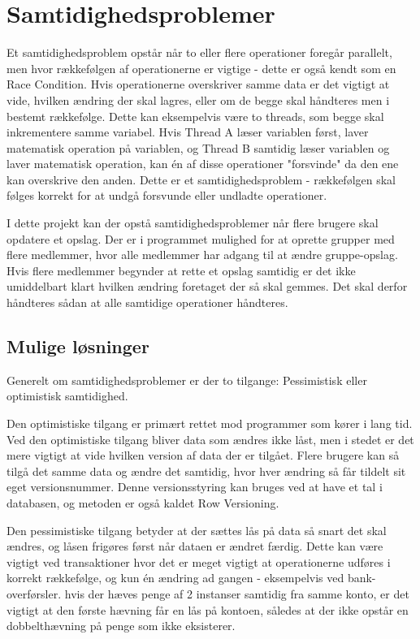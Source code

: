 \chapter{Samtidighedsproblemer}\label{ch:concurrency}
Et samtidighedsproblem opstår når to eller flere operationer foregår parallelt, men hvor rækkefølgen af operationerne er vigtige - dette er også kendt som en Race Condition.\cite{racecondition} Hvis operationerne overskriver samme data er det vigtigt at vide, hvilken ændring der skal lagres, eller om de begge skal håndteres men i bestemt rækkefølge. Dette kan eksempelvis være to threads, som begge skal inkrementere samme variabel. Hvis Thread A læser variablen først, laver matematisk operation på variablen, og Thread B samtidig læser variablen og laver matematisk operation, kan én af disse operationer "forsvinde" da den ene kan overskrive den anden. Dette er et samtidighedsproblem - rækkefølgen skal følges korrekt for at undgå forsvunde eller undladte operationer.

I dette projekt kan der opstå samtidighedsproblemer når flere brugere skal opdatere et opslag. Der er i programmet mulighed for at oprette grupper med flere medlemmer, hvor alle medlemmer har adgang til at ændre gruppe-opslag. Hvis flere medlemmer begynder at rette et opslag samtidig er det ikke umiddelbart klart hvilken ændring foretaget der så skal gemmes. Det skal derfor håndteres sådan at alle samtidige operationer håndteres.


\section{Mulige løsninger}\label{sec:solutions}
Generelt om samtidighedsproblemer er der to tilgange: Pessimistisk eller optimistisk samtidighed. 

Den optimistiske tilgang er primært rettet mod programmer som kører i lang tid. Ved den optimistiske tilgang bliver data som ændres ikke låst, men i stedet er det mere vigtigt at vide hvilken version af data der er tilgået. Flere brugere kan så tilgå det samme data og ændre det samtidig, hvor hver ændring så får tildelt sit eget versionsnummer. Denne versionsstyring kan bruges ved at have et tal i databasen, og metoden er også kaldet Row Versioning\cite{rowversioning}.

Den pessimistiske tilgang betyder at der sættes lås på data så snart det skal ændres, og låsen frigøres først når dataen er ændret færdig. Dette kan være vigtigt ved transaktioner hvor det er meget vigtigt at operationerne udføres i korrekt rækkefølge, og kun én ændring ad gangen - eksempelvis ved bank-overførsler. hvis der hæves penge af 2 instanser samtidig fra samme konto, er det vigtigt at den første hævning får en lås på kontoen, således at der ikke opstår en dobbelthævning på penge som ikke eksisterer. 


